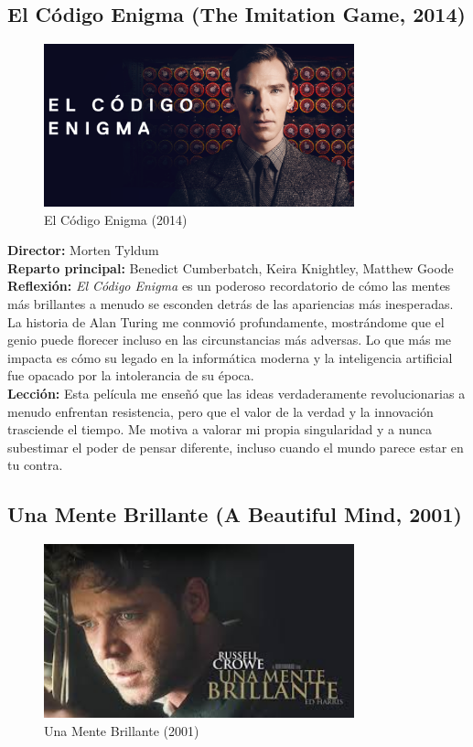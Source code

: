 \documentclass[12pt,a4paper,spanish]{article}
\begin{document}
\subsection{El Código Enigma (The Imitation Game, 2014)}
\begin{figure}[H]
    \centering
    \includegraphics[width=0.8\textwidth]{codigo_enigma.png}
    \caption{El Código Enigma (2014)}
    \label{fig:codigo_enigma}
\end{figure}

\textbf{Director:} Morten Tyldum\\
\textbf{Reparto principal:} Benedict Cumberbatch, Keira Knightley, Matthew Goode\\
\textbf{Reflexión:} \emph{El Código Enigma} es un poderoso recordatorio de cómo las mentes más brillantes a menudo se esconden detrás de las apariencias más inesperadas. La historia de Alan Turing me conmovió profundamente, mostrándome que el genio puede florecer incluso en las circunstancias más adversas. Lo que más me impacta es cómo su legado en la informática moderna y la inteligencia artificial fue opacado por la intolerancia de su época.\\

\textbf{Lección:} Esta película me enseñó que las ideas verdaderamente revolucionarias a menudo enfrentan resistencia, pero que el valor de la verdad y la innovación trasciende el tiempo. Me motiva a valorar mi propia singularidad y a nunca subestimar el poder de pensar diferente, incluso cuando el mundo parece estar en tu contra.

\vspace{1cm}

\subsection{Una Mente Brillante (A Beautiful Mind, 2001)}
\begin{figure}[H]
    \centering
    \includegraphics[width=0.8\textwidth]{una_mente_brillante.jpg}
    \caption{Una Mente Brillante (2001)}
    \label{fig:una_mente_brillante}
\end{figure}
\end{document}
